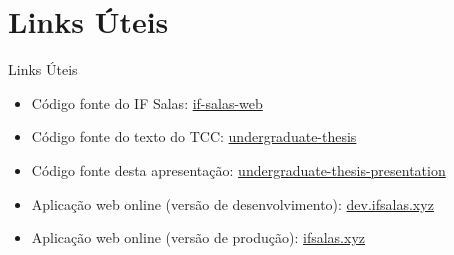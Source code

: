 \AtBeginSection[]{
	\begin{frame}
		\frametitle{}
		\tableofcontents[currentsection]
	\end{frame}
}

\section{Links Úteis}
\begin{frame}{Links Úteis}
	\begin{itemize}[]
		\item Código fonte do IF Salas: \href{https://github.com/leomurca/if-salas-web}{if-salas-web}
		\item Código fonte do texto do TCC: \href{https://github.com/leomurca/undergraduate-thesis}{undergraduate-thesis}
		\item Código fonte desta apresentação: \href{https://github.com/leomurca/undergraduate-thesis-presentation}{undergraduate-thesis-presentation}
		\item Aplicação web online (versão de desenvolvimento): \href{https://dev.ifsalas.xyz/}{dev.ifsalas.xyz}
		\item Aplicação web online (versão de produção): \href{https://ifsalas.xyz/}{ifsalas.xyz}
	\end{itemize}
\end{frame}